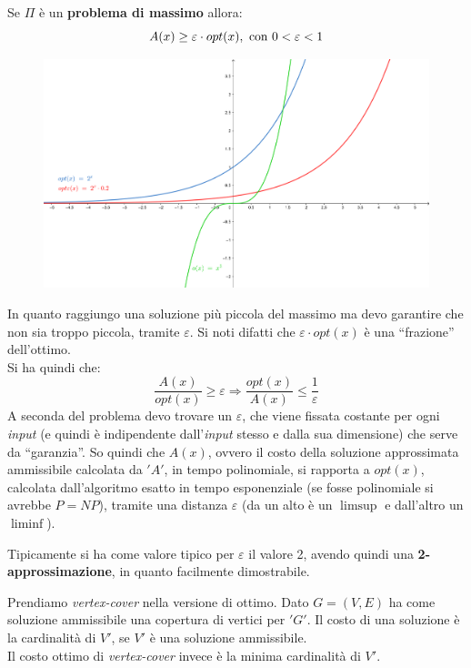 							\begin{definizione}
								Se $\Pi$ è un \textbf{problema di massimo} allora:
								\[A(x)\geq \varepsilon\cdot opt(x), \mbox{ \textnormal{con} }0<\varepsilon<1\]
								\begin{figure}[H]
									\centering
									\includegraphics[width=1\textwidth]{img/epsilon2.png}
								\end{figure}
							\end{definizione}
							In quanto raggiungo una soluzione più piccola del massimo ma devo garantire
							che non sia troppo piccola, tramite $\varepsilon$. Si noti difatti che $\varepsilon\cdot opt(x)$ è una ``frazione'' dell'ottimo.\\
							Si ha quindi che:
							\[\frac{A(x)}{opt(x)}\geq \varepsilon\Longrightarrow\frac{opt(x)}{A(x)}\leq
								\frac{1}{\varepsilon}\]
								A seconda del problema devo trovare un $\varepsilon$, che viene fissata
								costante per ogni \textit{input} (e quindi è indipendente dall'\textit{input} stesso e dalla sua
								dimensione) che serve da ``garanzia''. So quindi che $A(x)$, ovvero il costo
								della soluzione approssimata ammissibile calcolata da $ 'A' $, in tempo
								polinomiale, si rapporta a $opt(x)$, calcolata dall'algoritmo esatto in tempo
								esponenziale (se fosse polinomiale si avrebbe $P=NP$), tramite una distanza
								$\varepsilon$ (da un alto è un $\limsup$ e dall'altro un $\liminf$).\\
								\begin{nota}
									Tipicamente si ha come valore tipico per $\varepsilon$ il valore 2, avendo quindi
									una \textbf{2-approssimazione}, in quanto facilmente dimostrabile.
								\end{nota}
								\begin{esempio}
									Prendiamo \textit{vertex-cover} nella versione di ottimo. Dato $G=(V,E)$ ha
									come soluzione ammissibile una copertura di vertici per $ 'G' $. Il costo di una
									soluzione è la cardinalità di $V'$, se $V'$ è una soluzione ammissibile.\\
									Il costo ottimo di \textit{vertex-cover} invece è la minima cardinalità di
									$V'$.
								\end{esempio}

